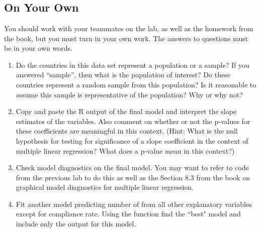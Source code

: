 \documentclass[11pt]{article}
\begin{document}
\ttfamily\noindent
\hlstd{}\hspace*{\fill}\\
\hlstd{}\hlassignement{=}{\ }\hlkeyword{(}\hlkeyword{\urltilda{}}{\ }{\ }\hlkeyword{+}{\ }\hlkeyword{,}{\ }\hlargument{=}{\ }\hlkeyword{)}\hspace*{\fill}\\
\hlstd{}\hlkeyword{(}\hlkeyword{)}\hspace*{\fill}\\
\normalfont

\vfill

\subsection*{On Your Own}

You should work with your teammates on the lab, as well as the homework from the book, but you must turn in your own work. The answers to questions must be in your own words.\\

\begin{enumerate}

\item Do the countries in this data set represent a population or a sample? If you answered ``sample'', then what is the population of interest? Do these countries represent a random sample from this population? Is it reasonable to assume this sample is representative of the population? Why or why not?

\item Copy and paste the R output of the final model and interpret the slope estimates of the variables. Also comment on whether or not the p-values for these coefficients are meaningful in this context. (Hint: What is the null hypothesis for testing for significance of a slope coefficient in the context of multiple linear regression? What does a p-value mean in this context?)

\item Check model diagnostics on the final model. You may want to refer to code from the previous lab to do this as well as the Section 8.3 from the book on graphical model diagnostics for multiple linear regression.

\item Fit another model predicting number of \texttt{}from all other explanatory variables except for compliance rate. Using the \texttt{} function find the ``best" model and include only the output for this model.

\end{enumerate}
\end{document}
